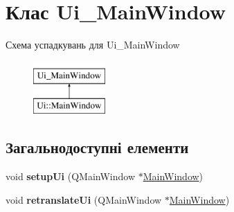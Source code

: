 \hypertarget{classUi__MainWindow}{\section{Клас Ui\-\_\-\-Main\-Window}
\label{classUi__MainWindow}
}
Схема успадкувань для Ui\-\_\-\-Main\-Window\begin{figure}[H]
\begin{center}
\leavevmode
\includegraphics[height=2.000000cm]{classUi__MainWindow}
\end{center}
\end{figure}
\subsection*{Загальнодоступні елементи}
\begin{DoxyCompactItemize}
\item 
\hypertarget{classUi__MainWindow_acf4a0872c4c77d8f43a2ec66ed849b58}{void {\bfseries setup\-Ui} (Q\-Main\-Window $\ast$\hyperlink{classMainWindow}{Main\-Window})}\label{classUi__MainWindow_acf4a0872c4c77d8f43a2ec66ed849b58}

\item 
\hypertarget{classUi__MainWindow_a097dd160c3534a204904cb374412c618}{void {\bfseries retranslate\-Ui} (Q\-Main\-Window $\ast$\hyperlink{classMainWindow}{Main\-Window})}\label{classUi__MainWindow_a097dd160c3534a204904cb374412c618}

\end{DoxyCompactItemize}
